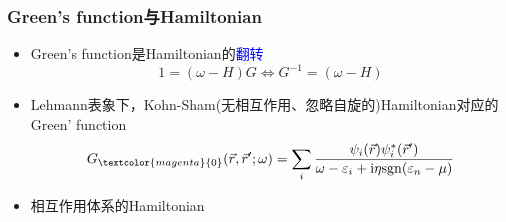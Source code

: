 {\frame
{
	\frametitle{\textrm{Green's function}与\textrm{Hamiltonian}}
	\begin{itemize}
		\item \textrm{Green's function}是\textrm{Hamiltonian}的\textcolor{blue}{翻转}
			\begin{displaymath}
				1=(\omega-H)G\Longleftrightarrow G^{-1}=(\omega -H)
			\end{displaymath}
		\item \textrm{Lehmann}表象下，\textrm{Kohn-Sham}(无相互作用、忽略自旋的)\textrm{Hamiltonian}对应的\textrm{Green' function}
			\begin{displaymath}
				G_{\textcolor{magenta}{0}}(\vec r,\vec r^{\prime};\omega)=\sum_i\dfrac{\psi_i(\vec r)\psi_i^{\ast}(\vec r^{\prime})}{\omega-\varepsilon_i+\mathrm{i}\eta\mathrm{sgn}(\varepsilon_n-\mu)}
			\end{displaymath}
			{\fontsize{6.2pt}{6.2pt}}
		\item 相互作用体系的\textrm{Hamiltonian}%
		\fontsize{9.5pt}{4.2pt}
	\end{itemize}
}

}
